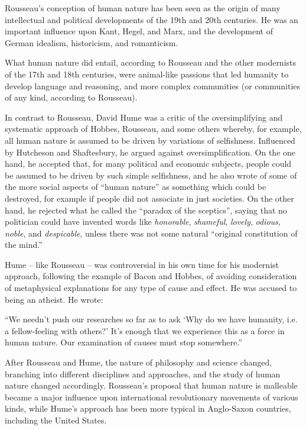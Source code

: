 Rousseau’s conception of human nature has been seen as the origin of many intellectual and political developments of the 19th and 20th centuries. He was an important influence upon Kant, Hegel, and Marx, and the development of German idealism, historicism, and romanticism.

What human nature did entail, according to Rousseau and the other modernists of the 17th and 18th centuries, were animal-like passions that led humanity to develop language and reasoning, and more complex communities (or communities of any kind, according to Rousseau).

In contrast to Rousseau, David Hume was a critic of the oversimplifying and systematic approach of Hobbes, Rousseau, and some others whereby, for example, all human nature is assumed to be driven by variations of selfishness. Influenced by Hutcheson and Shaftesbury, he argued against oversimplification. On the one hand, he accepted that, for many political and economic subjects, people could be assumed to be driven by such simple selfishness, and he also wrote of some of the more social aspects of ``human nature'' as something which could be destroyed, for example if people did not associate in just societies. On the other hand, he rejected what he called the ``paradox of the sceptics'', saying that no politician could have invented words like \textit{honorable}, \textit{shameful}, \textit{lovely}, \textit{odious}, \textit{noble}, and \textit{despicable}, unless there was not some natural ``original constitution of the mind.''

Hume – like Rousseau – was controversial in his own time for his modernist approach, following the example of Bacon and Hobbes, of avoiding consideration of metaphysical explanations for any type of cause and effect. He was accused to being an atheist. He wrote:

``We needn’t push our researches so far as to ask `Why do we have humanity, i.e. a fellow-feeling with others?'  It’s enough that we experience this as a force in human nature. Our examination of causes must stop somewhere.''

After Rousseau and Hume, the nature of philosophy and science changed, branching into different disciplines and approaches, and the study of human nature changed accordingly. Rousseau’s proposal that human nature is malleable became a major influence upon international revolutionary movements of various kinds, while Hume’s approach has been more typical in Anglo-Saxon countries, including the United States.

